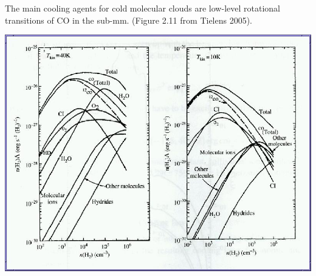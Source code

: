 The main cooling agents for cold molecular clouds are low-level
rotational transitions of CO in the sub-mm. (Figure 2.11 from Tielens
2005).
\begin{center}
\includegraphics[width=17cm,height=!]{./B/CO_cooling_Tielens.jpg}
\end{center}





